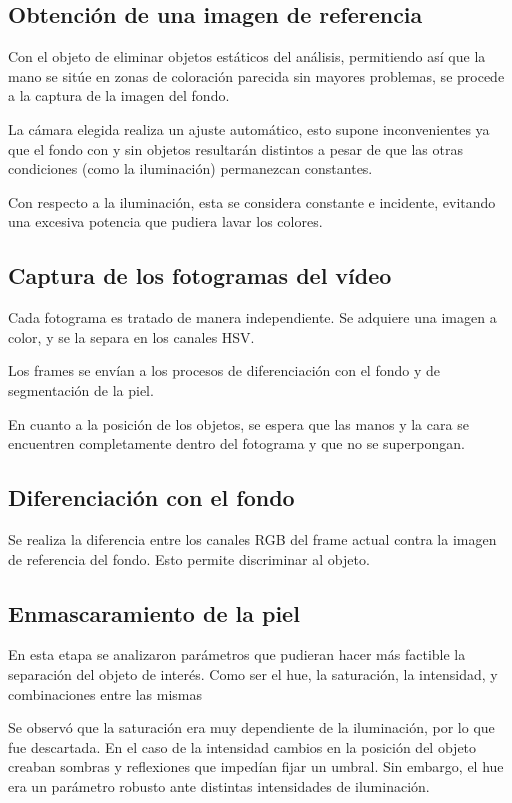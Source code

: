 \documentclass[portrait,a0paper,fontscale=0.277]{baposter}
\begin{document}
\begin{poster}
{   	 \subsection{Obtención de una imagen de referencia}
		Con el objeto de eliminar objetos estáticos del análisis, 
   		 permitiendo así que la mano se sitúe en zonas de coloración parecida
   		 sin mayores problemas, 
se procede a la captura de la imagen del fondo.
		
		La cámara elegida realiza un ajuste automático, esto supone inconvenientes ya que el fondo con y sin objetos resultarán distintos a pesar 
	de que las otras condiciones (como la iluminación) permanezcan constantes.

   		 Con respecto a la iluminación, esta se considera constante e incidente,
   		 evitando una excesiva potencia que pudiera lavar los colores.

   	 \subsection{Captura de los fotogramas del vídeo}
   		 Cada fotograma es tratado de manera independiente.
   		 Se adquiere una imagen a color, y se la separa en los canales HSV.
		
		Los frames se envían a los procesos de diferenciación con el fondo 
		y de segmentación de la piel.

En cuanto a la posición de los objetos, se espera que las manos y la cara se encuentren completamente dentro del fotograma y que no se superpongan.

   	 \subsection{Diferenciación con el fondo}
		Se realiza la diferencia entre los canales RGB del frame actual contra
		la imagen de referencia del fondo.
		Esto permite discriminar al objeto.

   	 \subsection{Enmascaramiento de la piel}
   		 En esta etapa se analizaron parámetros que pudieran hacer
   		 más factible la separación del objeto de interés.
   		 Como ser el hue, la saturación, la intensidad, y combinaciones entre las mismas
   		 
   		 Se observó que la saturación era muy dependiente de la iluminación, por lo que fue descartada.
   		 En el caso de la intensidad cambios en la posición del objeto creaban sombras y reflexiones que impedían fijar un umbral.
   		 Sin embargo, el hue era un parámetro robusto ante distintas intensidades de iluminación.
		
}
\end{poster}
\end{document}
